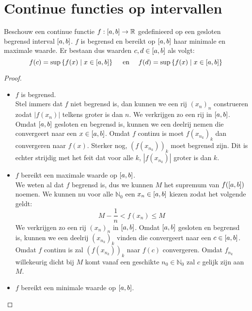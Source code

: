 \documentclass[main.tex]{subfiles}
\begin{document}
\section{Continue functies op intervallen}
\label{sec:continue-functies-op}

\begin{bst}
  \label{st:continue-functie-op-gesloten-begrensd-interval-bereikt-extreme-waarden}
  Beschouw een continue functie $f: \interval{a}{b} \rightarrow \mathbb{R}$ gedefinieerd op een gesloten begrensd interval $\interval{a}{b}$.
  $f$ is begrensd en bereikt op $\interval{a}{b}$ haar minimale en maximale waarde.
  Er bestaan dus waarden $c,d \in \interval{a}{b}$ als volgt:
  \[ f(c) = \sup\left\{ f(x) \mid x \in \interval{a}{b} \right\} \quad\text{ en }\quad f(d) = \sup\left\{ f(x) \mid x \in \interval{a}{b} \right\} \]

  \begin{proof}
    \begin{itemize}
    \item $f$ is begrensd.\\
      Stel immers dat $f$ niet begrensd is, dan kunnen we een rij $(x_{n})_{n}$ construeren zodat $|f(x_{n})|$ telkens groter is dan $n$.
      We verkrijgen zo een rij in $\interval{a}{b}$.
      Omdat $\interval{a}{b}$ gesloten en begrensd is, kunnen we een deelrij nemen die convergeert naar een $x\in\interval{a}{b}$.
      Omdat $f$ continu is moet $f(x_{n_{k}})_{k}$ dan convergeren naar $f(x)$.
      Sterker nog, $(f(x_{n_{k}}))_{k}$ moet begrensd zijn.
      Dit is echter strijdig met het feit dat voor alle $k$, $|f(x_{n_{k}})|$ groter is dan $k$.
    \item $f$ bereikt een maximale waarde op $\interval{a}{b}$.\\
      We weten al dat $f$ begrensd is, dus we kunnen $M$ het supremum van $f(\interval{a}{b})$ noemen.
      We kunnen nu voor alle $\mathbb{N}_{0}$ een $x_{n} \in \interval{a}{b}$ kiezen zodat het volgende geldt:\waarom
      \[ M- \frac{1}{n} < f(x_{n}) \le M \]
      We verkrijgen zo een rij $(x_{n})_{n}$ in $\interval{a}{b}$.
      Omdat $\interval{a}{b}$ gesloten en begrensd is, kunnen we een deelrij $(x_{n_{k}})_{k}$ vinden die convergeert naar een $c\in \interval{a}{b}$.
      Omdat $f$ continu is zal $(f(x_{n_{k}}))_{k}$ naar $f(c)$ convergeren.
      Omdat $f_{n_{k}}$ willekeurig dicht bij $M$ komt vanaf een geschikte $n_{0}\in\mathbb{N}_{0}$ zal $c$ gelijk zijn aan $M$.
    \item $f$ bereikt een minimale waarde op $\interval{a}{b}$.\\
    \end{itemize}
  \end{proof}
\end{bst}
\end{document}

